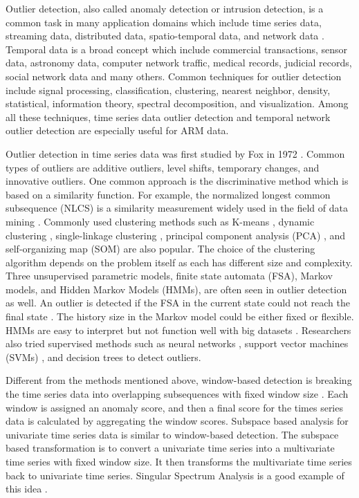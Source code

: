 \documentclass[letterpaper, 10 pt, conference]{ieeeconf}  %
\begin{document}
Outlier detection, also called anomaly detection or intrusion detection, is a common task in many application domains which include time series data, streaming data, distributed data, spatio-temporal data, and network data \cite{gupta2014outlier}. Temporal data is a broad concept which include commercial transactions, sensor data, astronomy data, computer network traffic, medical records, judicial records, social network data and many others. Common techniques for outlier detection include signal processing, classification, clustering, nearest neighbor, density, statistical, information theory, spectral decomposition, and visualization. Among all these techniques, time series data outlier detection and temporal network outlier detection are especially useful for ARM data.

Outlier detection in time series data was first studied by Fox in 1972 \cite{fox1972outliers}. Common types of outliers are additive outliers, level shifts, temporary changes, and innovative outliers. One common approach is the discriminative method which is based on a similarity function. For example, the normalized longest common subsequence (NLCS) is a similarity measurement widely used in the field of data mining \cite{budalakoti2009anomaly, chandola2008comparative, sequeira2002admit}. Commonly used clustering methods such as K-means \cite{macqueen1967some}, dynamic clustering \cite{sequeira2002admit}, single-linkage clustering \cite{portnoy2001intrusion}, principal component analysis (PCA) \cite{gupta2013context}, and self-organizing map (SOM) \cite{gonzalez2003anomaly} are also popular. The choice of the clustering algorithm depends on the problem itself as each has different size and complexity. Three unsupervised parametric models, finite state automata (FSA), Markov models, and Hidden Markov Models (HMMs), are often seen in outlier detection as well. An outlier is detected if the FSA in the current state could not reach the final state \cite{chandola2008comparative}. The history size in the Markov model could be either fixed or flexible. HMMs are easy to interpret but not function well with big datasets \cite{chandola2008comparative}. Researchers also tried supervised methods such as neural networks \cite{dasgupta2000comparison}, support vector machines (SVMs) \cite{li2006motion}, and decision trees \cite{kang2005learning} to detect outliers.

Different from the methods mentioned above, window-based detection is breaking the time series data into overlapping subsequences with fixed window size \cite{cheboli2010anomaly}. Each window is assigned an anomaly score, and then a final score for the times series data is calculated by aggregating the window scores. Subspace based analysis for univariate time series data is similar to window-based detection. The subspace based transformation is to convert a univariate time series into a multivariate time series with fixed window size. It then transforms the multivariate time series back to univariate time series. Singular Spectrum Analysis is a good example of this idea \cite{golyandina2013singular}.
\end{document}
